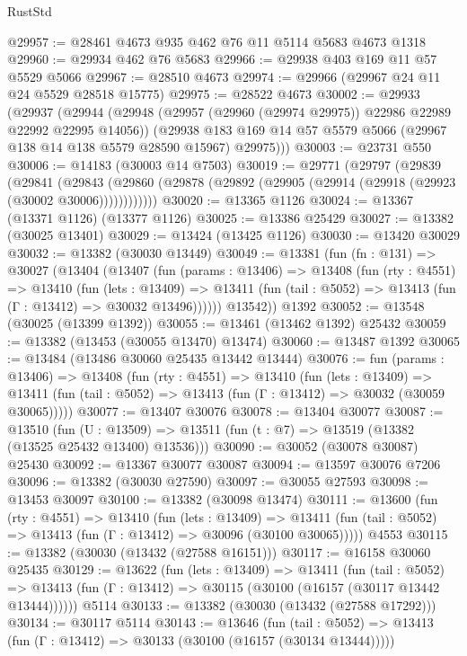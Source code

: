 \begin{lexlean}{RustStd}
\begin{coremodule}
@29957 := @28461 @4673 @935 @462 @76 @11 @5114 @5683 @4673 @1318
@29960 := @29934 @462 @76 @5683
@29966 := @29938 @403 @169 @11 @57 @5529 @5066
@29967 := @28510 @4673
@29974 := @29966 (@29967 @24 @11 @24 @5529 @28518 @15775)
@29975 := @28522 @4673
@30002 := @29933
    (@29937
      (@29944
        (@29948 (@29957 (@29960 (@29974 @29975)) @22986 @22989 @22992 @22995 @14056))
        (@29938 @183 @169 @14 @57 @5579 @5066 (@29967 @138 @14 @138 @5579 @28590 @15967) @29975)))
@30003 := @23731 @550
@30006 := @14183 (@30003 @14 @7503)
@30019 := @29771
    (@29797
      (@29839
        (@29841
          (@29843 (@29860 (@29878 (@29892 (@29905 (@29914 (@29918 (@29923 (@30002 @30006))))))))))))
@30020 := @13365 @1126
@30024 := @13367 (@13371 @1126) (@13377 @1126)
@30025 := @13386 @25429
@30027 := @13382 (@30025 @13401)
@30029 := @13424 (@13425 @1126)
@30030 := @13420 @30029
@30032 := @13382 (@30030 @13449)
@30049 := @13381
    (fun (fn : @131) =>
    @30027
      (@13404
        (@13407
          (fun (params : @13406) =>
          @13408
            (fun (rty : @4551) =>
            @13410
              (fun (lets : @13409) =>
              @13411 (fun (tail : @5052) => @13413 (fun (Γ : @13412) => @30032 @13496))))))
        @13542))
    @1392
@30052 := @13548 (@30025 (@13399 @1392))
@30055 := @13461 (@13462 @1392) @25432
@30059 := @13382 (@13453 (@30055 @13470) @13474)
@30060 := @13487 @1392
@30065 := @13484 (@13486 @30060 @25435 @13442 @13444)
@30076 := fun (params : @13406) =>
  @13408
    (fun (rty : @4551) =>
    @13410
      (fun (lets : @13409) =>
      @13411 (fun (tail : @5052) => @13413 (fun (Γ : @13412) => @30032 (@30059 @30065)))))
@30077 := @13407 @30076
@30078 := @13404 @30077
@30087 := @13510
    (fun (U : @13509) => @13511 (fun (t : @7) => @13519 (@13382 (@13525 @25432 @13400) @13536)))
@30090 := @30052 (@30078 @30087) @25430
@30092 := @13367 @30077 @30087
@30094 := @13597 @30076 @7206
@30096 := @13382 (@30030 @27590)
@30097 := @30055 @27593
@30098 := @13453 @30097
@30100 := @13382 (@30098 @13474)
@30111 := @13600
    (fun (rty : @4551) =>
    @13410
      (fun (lets : @13409) =>
      @13411 (fun (tail : @5052) => @13413 (fun (Γ : @13412) => @30096 (@30100 @30065)))))
    @4553
@30115 := @13382 (@30030 (@13432 (@27588 @16151)))
@30117 := @16158 @30060 @25435
@30129 := @13622
    (fun (lets : @13409) =>
    @13411
      (fun (tail : @5052) =>
      @13413 (fun (Γ : @13412) => @30115 (@30100 (@16157 (@30117 @13442 @13444))))))
    @5114
@30133 := @13382 (@30030 (@13432 (@27588 @17292)))
@30134 := @30117 @5114
@30143 := @13646
    (fun (tail : @5052) => @13413 (fun (Γ : @13412) => @30133 (@30100 (@16157 (@30134 @13444)))))

\end{coremodule}
\end{lexlean}
